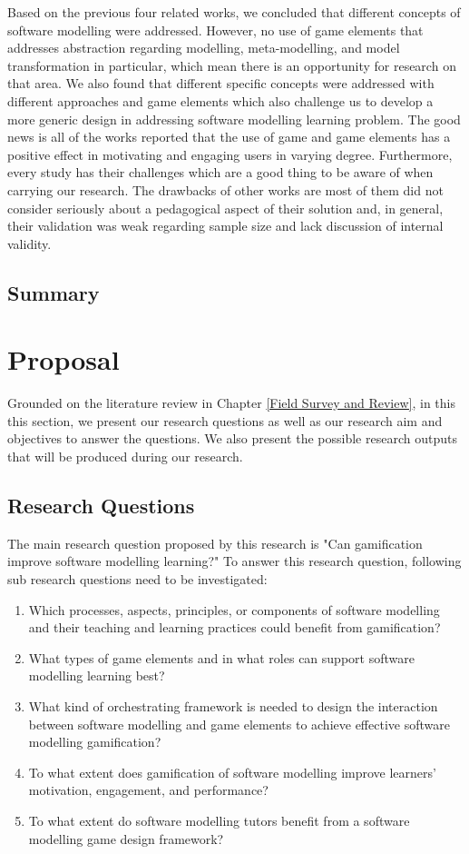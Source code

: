 \documentclass[12pt, a4paper]{report}
\begin{document}
{Based on the previous four related works, we concluded that different concepts of software modelling were addressed. However, no use of game elements that addresses abstraction regarding modelling, meta-modelling, and model transformation in particular, which mean there is an opportunity for research on that area. We also found that different specific concepts were addressed with different approaches and game elements which also challenge us to develop a more generic design in addressing software modelling learning problem. The good news is all of the works reported that the use of game and game elements has a positive effect in motivating and engaging users in varying degree. Furthermore, every study has their challenges which are a good thing to be aware of when carrying our research. The drawbacks of other works are most of them did not consider seriously about a pedagogical aspect of their solution and, in general, their validation was weak regarding sample size and lack discussion of internal validity.     

\section{Summary}



\chapter{Proposal}
\label{Proposal}
Grounded on the literature review in Chapter \ref{Field Survey and Review}, in this this section, we present our research questions as well as our research aim and objectives to answer the questions. We also present the possible research outputs that will be produced during our research.  

\section{Research Questions}
The main research question proposed by this research is "Can gamification improve software modelling learning?" To answer this research question, following sub research questions need to be investigated:
\begin{enumerate}
\item Which processes, aspects, principles, or components of software modelling and their teaching and learning practices could benefit from gamification?
\item What types of game elements and in what roles can support software modelling learning best? 
\item What kind of orchestrating framework is needed to design the interaction between software modelling and game elements to achieve effective software modelling gamification?
\item To what extent does gamification of software modelling improve learners' motivation, engagement, and performance?
\item To what extent do software modelling tutors benefit from a software modelling game design framework?
\end{enumerate}

}
\end{document}
